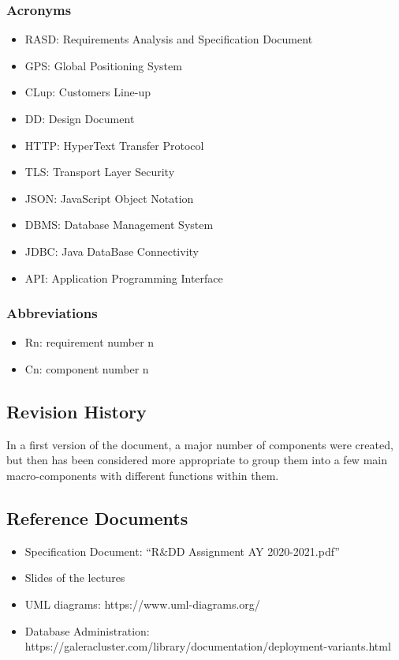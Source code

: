 		\subsubsection{Acronyms}
		\begin{itemize}
			\item \textcolor{BrickRed}{RASD}: Requirements Analysis and Specification Document 
			\item \textcolor{BrickRed}{GPS}: Global Positioning System
			\item \textcolor{BrickRed}{CLup}: Customers Line-up
			\item \textcolor{BrickRed}{DD}: Design Document 
			\item \textcolor{BrickRed}{HTTP}: HyperText Transfer Protocol
			\item \textcolor{BrickRed}{TLS}: Transport Layer Security
			\item \textcolor{BrickRed}{JSON}: JavaScript Object Notation
			\item \textcolor{BrickRed}{DBMS}: Database Management System
			\item \textcolor{BrickRed}{JDBC}: Java DataBase Connectivity
			\item \textcolor{BrickRed}{API}: Application Programming Interface
		\end{itemize}
		
		\subsubsection{Abbreviations}
		\begin{itemize}
			\item \textcolor{BrickRed}{Rn}: requirement number n
			\item \textcolor{BrickRed}{Cn}: component number n
		\end{itemize}
		
	\subsection{Revision History}
	In a first version of the document, a major number of components were created, but then has been considered more appropriate to group them into a few main macro-components with different functions within them.
	
	\subsection{Reference Documents}
	\begin{itemize}
			\item \textcolor{BrickRed}{Specification Document}: “R\&DD Assignment AY 2020-2021.pdf”
			\item \textcolor{BrickRed}{Slides of the lectures}
			\item \textcolor{BrickRed}{UML diagrams: https://www.uml-diagrams.org/}
			\item \textcolor{BrickRed}{Database Administration: https://galeracluster.com/library/documentation/deployment-variants.html}
	\end{itemize}
		
